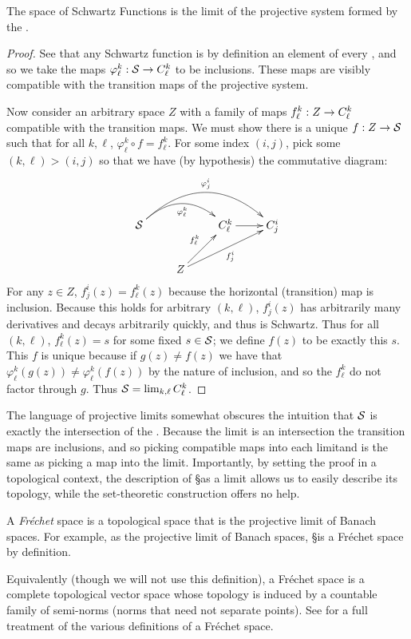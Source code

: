       \begin{thm}
        The space of Schwartz Functions is the limit of the projective system formed by the \Ckl.
      \end{thm}
      \begin{proof}
        See that any Schwartz function is by definition an element of every \Ckl, and so we take the maps $\varphi^k_\ell:\S\rightarrow\Ckl$ to be inclusions.
        These maps are visibly compatible with the transition maps of the projective system.

        Now consider an arbitrary space $Z$ with a family of maps $f^k_\ell:Z\rightarrow\Ckl$ compatible with the transition maps.
        We must show there is a unique $f:Z\rightarrow\S$ such that for all $k,\ell$, $\varphi^k_\ell\circ f = f^k_\ell$.
        For some index $(i,j)$, pick some $(k,\ell)>(i,j)$ so that we have (by hypothesis) the commutative diagram:
        \begin{displaymath}
          \xymatrix{
            \S \ar@/^20pt/[rr]_{\varphi^k_\ell} \ar@/^30pt/[rrr]^{\varphi^i_j} && \Ckl \ar[r] & \Cij \\
            & Z \ar[ur]^{f^k_\ell} \ar[urr]_{f^i_j}
          }
        \end{displaymath}
        For any $z\in Z$, $f^i_j(z)=f^k_\ell(z)$ because the horizontal (transition) map is inclusion.
        Because this holds for arbitrary $(k,\ell)$, $f^i_j(z)$ has arbitrarily many derivatives and decays arbitrarily quickly, and thus is Schwartz.
        Thus for all $(k,\ell)$, $f^k_\ell(z)=s$ for some fixed $s\in\S$; we define $f(z)$ to be exactly this $s$.
        This $f$ is unique because if $g(z)\ne f(z)$ we have that $\varphi^k_\ell(g(z))\ne\varphi^k_\ell(f(z))$ by the nature of inclusion, and so the $f^k_\ell$ do not factor through $g$.
        Thus $\S=\lim_{k,\ell}\Ckl$.
      \end{proof}
      \begin{rmk}
        The language of projective limits somewhat obscures the intuition that $\S$ is exactly the intersection of the \Ckl.
        Because the limit is an intersection the transition maps are inclusions, and so picking compatible maps into each limitand is the same as picking a map into the limit.
        Importantly, by setting the proof in a topological context, the description of \S as a limit allows us to easily describe its topology, while the set-theoretic construction offers no help.
      \end{rmk}
      \begin{defn}
        A \emph{Fr\'echet} space is a topological space that is the projective limit of Banach spaces.
        For example, as the projective limit of Banach spaces, \S is a Fr\'echet space by definition.

        Equivalently (though we will not use this definition), a Fr\'echet space is a complete topological vector space whose topology is induced by a countable family of semi-norms (norms that need not separate points).
        See \citet[]{functionsoncircles} for a full treatment of the various definitions of a Fr\'echet space.
      \end{defn}

